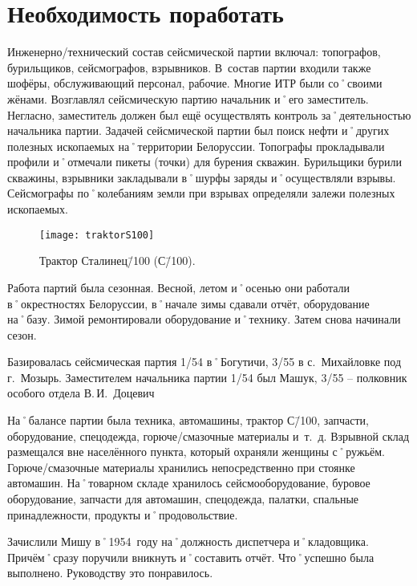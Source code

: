 ﻿\chapter{Необходимость поработать}

Инженерно\-/технический состав сейсмической партии включал: топографов, бурильщиков, сейсмографов, взрывников. В~состав партии входили также шофёры, обслуживающий персонал, рабочие. Многие ИТР были со˚своими жёнами. Возглавлял сейсмическую партию начальник и˚его заместитель. Негласно, заместитель должен был ещё осуществлять контроль за˚деятельностью начальника партии. Задачей сейсмической партии был поиск нефти и˚других полезных ископаемых на˚территории Белоруссии. Топографы прокладывали профили и˚отмечали пикеты (точки) для бурения скважин. Бурильщики бурили скважины, взрывники закладывали в˚шурфы заряды и˚осуществляли взрывы. Сейсмографы по˚колебаниям земли при взрывах определяли залежи полезных ископаемых.

\begin{wrapfigure}{O}{.4\textwidth}
\centering
\texttt{[image: traktorS100]}
\caption[Трактор Сталинец\=/100 (С\=/100).]{Трактор Сталинец\=/100 (С\=/100)\footnotemark.}
\label{fig:traktorS100}
\end{wrapfigure}

Работа партий была сезонная. Весной, летом и˚осенью они работали в˚окрестностях Белоруссии, в˚начале зимы сдавали отчёт, оборудование на˚базу. Зимой ремонтировали оборудование и˚технику. Затем снова начинали сезон.

Базировалась сейсмическая партия 1/54 в˚Богутичи, 3/55 в с.~Михайловке под г.~Мозырь. Заместителем начальника партии 1/54 был Машук, 3/55 \--- полковник особого отдела В.\,И.~Доцевич

На˚балансе партии была техника, автомашины, трактор С\=/100, запчасти, оборудование, спецодежда, горюче\-/смазочные материалы и~т.~д. Взрывной склад размещался вне населённого пункта, который охраняли женщины с˚ружьём. Горюче\-/смазочные материалы хранились непосредственно при стоянке автомашин. На˚товарном складе хранилось сейсмооборудование, буровое оборудование, запчасти для автомашин, спецодежда, палатки, спальные принадлежности, продукты и˚продовольствие.

Зачислили Мишу в˚1954~году на˚должность диспетчера и˚кладовщика. Причём˚сразу поручили вникнуть и˚составить отчёт. Что˚успешно была выполнено. Руководству это понравилось.

